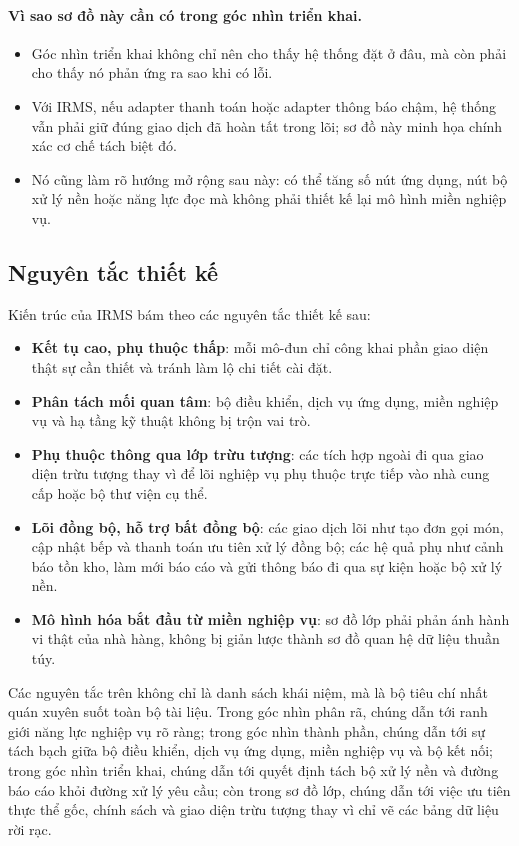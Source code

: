 \documentclass[11pt,a4paper]{article}
\begin{document}
\paragraph{Vì sao sơ đồ này cần có trong góc nhìn triển khai.}
\begin{itemize}
  \item Góc nhìn triển khai không chỉ nên cho thấy hệ thống đặt ở đâu, mà còn phải cho thấy nó phản ứng ra sao khi có lỗi.
  \item Với IRMS, nếu adapter thanh toán hoặc adapter thông báo chậm, hệ thống vẫn phải giữ đúng giao dịch đã hoàn tất trong lõi; sơ đồ này minh họa chính xác cơ chế tách biệt đó.
  \item Nó cũng làm rõ hướng mở rộng sau này: có thể tăng số nút ứng dụng, nút bộ xử lý nền hoặc năng lực đọc mà không phải thiết kế lại mô hình miền nghiệp vụ.
\end{itemize}

\subsection{Nguyên tắc thiết kế}
Kiến trúc của IRMS bám theo các nguyên tắc thiết kế sau:
\begin{itemize}
  \item \textbf{Kết tụ cao, phụ thuộc thấp}: mỗi mô-đun chỉ công khai phần giao diện thật sự cần thiết và tránh làm lộ chi tiết cài đặt.
  \item \textbf{Phân tách mối quan tâm}: bộ điều khiển, dịch vụ ứng dụng, miền nghiệp vụ và hạ tầng kỹ thuật không bị trộn vai trò.
  \item \textbf{Phụ thuộc thông qua lớp trừu tượng}: các tích hợp ngoài đi qua giao diện trừu tượng thay vì để lõi nghiệp vụ phụ thuộc trực tiếp vào nhà cung cấp hoặc bộ thư viện cụ thể.
  \item \textbf{Lõi đồng bộ, hỗ trợ bất đồng bộ}: các giao dịch lõi như tạo đơn gọi món, cập nhật bếp và thanh toán ưu tiên xử lý đồng bộ; các hệ quả phụ như cảnh báo tồn kho, làm mới báo cáo và gửi thông báo đi qua sự kiện hoặc bộ xử lý nền.
  \item \textbf{Mô hình hóa bắt đầu từ miền nghiệp vụ}: sơ đồ lớp phải phản ánh hành vi thật của nhà hàng, không bị giản lược thành sơ đồ quan hệ dữ liệu thuần túy.
\end{itemize}

Các nguyên tắc trên không chỉ là danh sách khái niệm, mà là bộ tiêu chí nhất quán xuyên suốt toàn bộ tài liệu. Trong góc nhìn phân rã, chúng dẫn tới ranh giới năng lực nghiệp vụ rõ ràng; trong góc nhìn thành phần, chúng dẫn tới sự tách bạch giữa bộ điều khiển, dịch vụ ứng dụng, miền nghiệp vụ và bộ kết nối; trong góc nhìn triển khai, chúng dẫn tới quyết định tách bộ xử lý nền và đường báo cáo khỏi đường xử lý yêu cầu; còn trong sơ đồ lớp, chúng dẫn tới việc ưu tiên thực thể gốc, chính sách và giao diện trừu tượng thay vì chỉ vẽ các bảng dữ liệu rời rạc.
\end{document}

